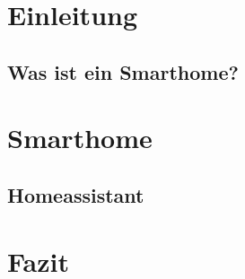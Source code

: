 
\section{Einleitung}

\subsection{Was ist ein Smarthome?}


\section{Smarthome}

\subsection{Homeassistant}


\section{Fazit}